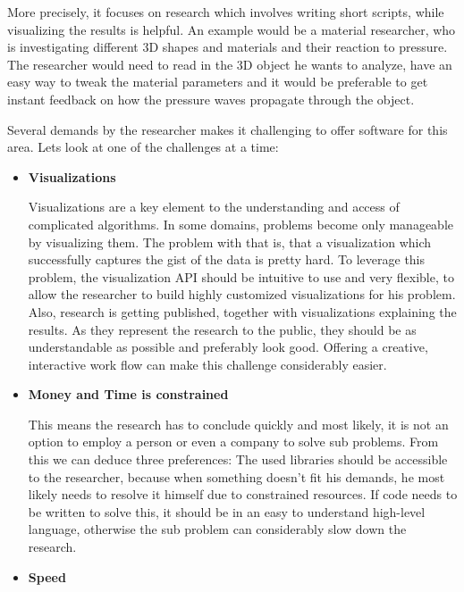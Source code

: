 More precisely, it focuses on research which involves writing short scripts, while visualizing the results is helpful. 
An example would be a material researcher, who is investigating different 3D shapes and materials and their reaction to pressure.
The researcher would need to read in the 3D object he wants to analyze, have an easy way to tweak the material parameters and it would be preferable to get instant feedback on how the pressure waves propagate through the object.

Several demands by the researcher makes it challenging to offer software for this area.
Lets look at one of the challenges at a time:

\begin{itemize} 

    \item  \textbf{Visualizations}

    Visualizations are a key element to the understanding and access of complicated algorithms.
    In some domains, problems become only manageable by visualizing them.
    The problem with that is, that a visualization which successfully captures the gist of the data is pretty hard.
    To leverage this problem, the visualization API should be intuitive to use and very flexible, to allow the researcher to build highly customized visualizations for his problem.
    Also, research is getting published, together with visualizations explaining the results. As they represent the research to the public, they should be as understandable as possible and preferably look good.
    Offering a creative, interactive work flow can make this challenge considerably easier.

    \item \textbf{Money and Time is constrained}
    
    This means the research has to conclude quickly and most likely, it is not an option to employ a person or even a company to solve sub problems.
    From this we can deduce three preferences: 
    The used libraries should be accessible to the researcher, because when something doesn't fit his demands, he most likely needs to resolve it himself due to constrained resources.
    If code needs to be written to solve this, it should be in an easy to understand high-level language, otherwise the sub problem can considerably slow down the research.

    \item \textbf{Speed}
    

\end{itemize}
